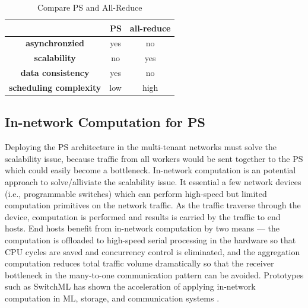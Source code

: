 \begin{table}[htb]
\caption{Compare PS and All-Reduce}

\begin{tabular}{|c|c|c|}
\hline
\multicolumn{1}{|r|}{}         & \multicolumn{1}{r|}{\textbf{PS}} & \multicolumn{1}{r|}{\textbf{all-reduce}} \\ \hline
\textbf{asynchronzied}         & yes                              & no                                       \\ \hline
\textbf{scalability}           & no                               & yes                                      \\ \hline
\textbf{data consistency}      & yes                              & no                                       \\ \hline
\textbf{scheduling complexity} & low                              & high                                     \\ \hline
\end{tabular}
\end{table}

\subsection{In-network Computation for PS}
Deploying the PS architecture in the multi-tenant networks must solve the scalability issue, because 
traffic from all workers would be sent together to the PS which could easily become a bottleneck. 
In-network computation is an potential approach to solve/alliviate the scalability issue. It essential
a few network devices (i.e., programmable switches) which can perform high-speed but limited 
computation primitives on the network traffic. As the traffic traverse through the device, computation
is performed and results is carried by the traffic to end hosts. End hosts benefit from in-network 
computation by two means --- the computation is offloaded to high-speed serial processing in the 
hardware so that CPU cycles are saved and concurrency control is eliminated, and the aggregation 
computation reduces total traffic volume dramatically so that the receiver bottleneck in the 
many-to-one communication pattern can be avoided. Prototypes such as SwitchML has 
shown the acceleration of applying in-network computation in ML, storage, and communication systems .

